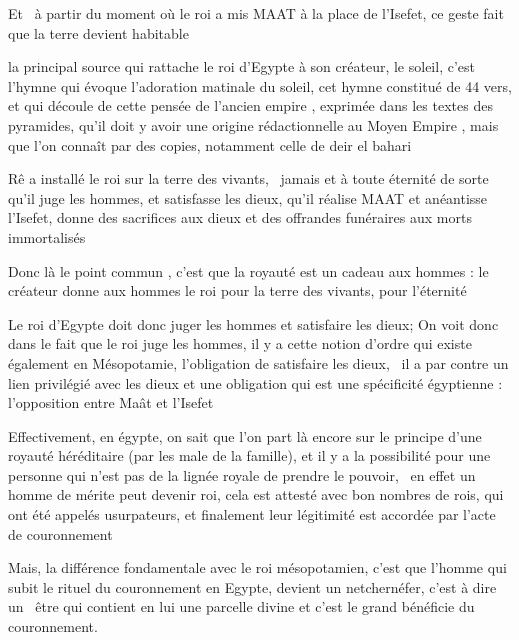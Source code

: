 \documentclass[a4paper]{article}
\begin{document}
{
Et \ à partir du moment où le roi a mis MAAT à la place de l'Isefet, ce
geste fait que la terre devient habitable}


\bigskip

{
la principal source qui rattache le roi d'Egypte à son créateur, le
soleil, c'est l'hymne qui évoque l'adoration matinale du soleil, cet
hymne constitué de 44 vers, et qui découle de cette pensée de l'ancien
empire , exprimée dans les textes des pyramides, qu'il doit y avoir une
origine rédactionnelle au Moyen Empire , mais que l'on connaît par des
copies, notamment celle de deir el bahari}


\bigskip

{
Rê a installé le roi sur la terre des vivants, \ jamais et à toute
éternité de sorte qu'il juge les hommes, et satisfasse les dieux, qu'il
réalise MAAT et anéantisse l'Isefet, donne des sacrifices aux dieux et
des offrandes funéraires aux morts immortalisés}


\bigskip

{
Donc là le point commun , c'est que la royauté est un cadeau aux hommes
: le créateur donne aux hommes le roi pour la terre des vivants, pour
l'éternité}

{
Le roi d'Egypte doit donc juger les hommes et satisfaire les dieux; On
voit donc dans le fait que le roi juge les hommes, il y a cette notion
d'ordre qui existe également en Mésopotamie, l'obligation de satisfaire
les dieux, \ il a par contre un lien privilégié avec les dieux et une
obligation qui est une spécificité égyptienne : l'opposition entre Maât
et l'Isefet}


\bigskip

{
Effectivement, en égypte, on sait que l'on part là encore sur le
principe d'une royauté héréditaire (par les male de la famille), et il
y a la possibilité pour une personne qui n'est pas de la lignée royale
de prendre le pouvoir, \ en effet un homme de mérite peut devenir roi,
cela est attesté avec bon nombres de rois, qui ont été appelés
usurpateurs, et finalement leur légitimité est accordée par l'acte de
couronnement}


\bigskip

{
Mais, la différence fondamentale avec le roi mésopotamien, c'est que
l'homme qui subit le rituel du couronnement en Egypte, devient un
netchernéfer, c'est à dire un \ être qui contient en lui une parcelle
divine et c'est le grand bénéficie du couronnement.}
\end{document}
